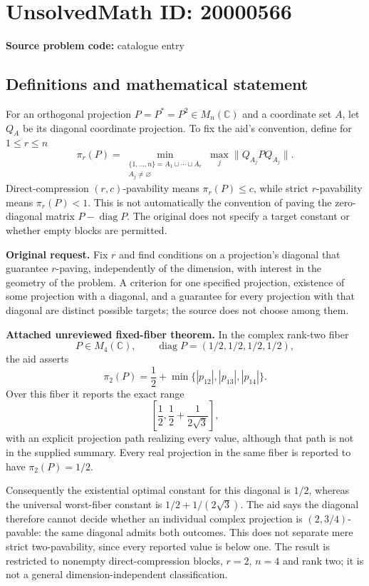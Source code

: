 \documentclass[11pt]{article}
\newcommand{\C}{\mathbb{C}}
\newcommand{\A}{\mathbb{A}}
\begin{document}
\section*{UnsolvedMath ID: 20000566}
\textbf{Source problem code:} catalogue entry
\subsection{Definitions and mathematical statement}
For an orthogonal projection $P=P^*=P^2\in M_n(\C)$ and a coordinate set $A$, let $Q_A$ be its diagonal coordinate projection. To fix the aid's convention, define for $1\le r\le n$
\[\pi_r(P)=\min_{\substack{\{1,\ldots,n\}=A_1\sqcup\cdots\sqcup A_r\\A_j\ne\varnothing}}\max_j\|Q_{A_j}PQ_{A_j}\|.\]
Direct-compression $(r,c)$-pavability means $\pi_r(P)\le c$, while strict $r$-pavability means $\pi_r(P)<1$. This is not automatically the convention of paving the zero-diagonal matrix $P-\operatorname{diag}P$. The original does not specify a target constant or whether empty blocks are permitted.

\textbf{Original request.} Fix $r$ and find conditions on a projection's diagonal that guarantee $r$-paving, independently of the dimension, with interest in the geometry of the problem. A criterion for one specified projection, existence of some projection with a diagonal, and a guarantee for every projection with that diagonal are distinct possible targets; the source does not choose among them.

\textbf{Attached unreviewed fixed-fiber theorem.} In the complex rank-two fiber
\[P\in M_4(\C),\qquad\operatorname{diag}P=(1/2,1/2,1/2,1/2),\]
the aid asserts
\[\pi_2(P)=\frac12+\min\{|p_{12}|,|p_{13}|,|p_{14}|\}.\]
Over this fiber it reports the exact range
\[\left[\frac12,\frac12+\frac1{2\sqrt3}\right],\]
with an explicit projection path realizing every value, although that path is not in the supplied summary. Every real projection in the same fiber is reported to have $\pi_2(P)=1/2$.

Consequently the existential optimal constant for this diagonal is $1/2$, whereas the universal worst-fiber constant is $1/2+1/(2\sqrt3)$. The aid says the diagonal therefore cannot decide whether an individual complex projection is $(2,3/4)$-pavable: the same diagonal admits both outcomes. This does not separate mere strict two-pavability, since every reported value is below one. The result is restricted to nonempty direct-compression blocks, $r=2$, $n=4$ and rank two; it is not a general dimension-independent classification.
\end{document}
